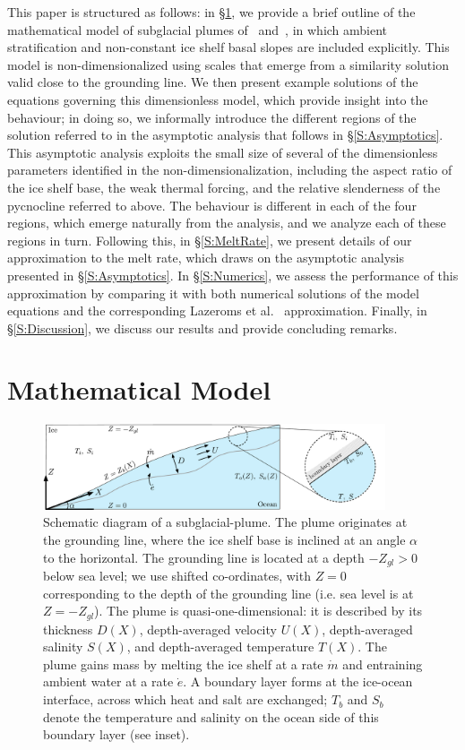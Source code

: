 \documentclass[openacc]{rsproca_new}%
\begin{document}
This paper is structured as follows: in \S\ref{S:Model}, we provide a brief outline of the mathematical model of subglacial plumes of~\cite{Jenkins1991JGeophysResOceans} and~\cite{Jenkins2011JPhysOcean}, in which ambient stratification and non-constant ice shelf basal slopes are included explicitly. This model is non-dimensionalized using scales that emerge from a similarity solution valid close to the grounding line. We then present example solutions of the equations governing this dimensionless model, which provide insight into the behaviour; in doing so, we informally introduce the different regions of the solution referred to in the asymptotic analysis that follows in \S\ref{S:Asymptotics}. This asymptotic analysis exploits the small size of several of the dimensionless parameters identified in the non-dimensionalization, including the aspect ratio of the ice shelf base, the weak thermal forcing, and the relative slenderness of the pycnocline referred to above. The behaviour is different in each of the four regions, which emerge naturally from the analysis, and we analyze each of these regions in turn. Following this, in \S\ref{S:MeltRate}, we present details of our approximation to the melt rate, which draws on the asymptotic analysis presented in \S\ref{S:Asymptotics}. In \S\ref{S:Numerics}, we assess the performance of this approximation by comparing it with both numerical solutions of the model equations and the corresponding Lazeroms et al.~\cite{Lazeroms2019JPhysOcean} approximation. Finally, in \S\ref{S:Discussion}, we discuss our results and provide concluding remarks. 


\section{Mathematical Model}\label{S:Model}

\begin{figure}
\centering
\includegraphics[width = 0.9\textwidth]{./make_plots/plots/figure1.pdf}
\caption{Schematic diagram of a subglacial-plume. The plume originates at the grounding line, where the ice shelf base is inclined at an angle $\alpha$ to the horizontal. The grounding line is located at a depth $-Z_{gl} >0$ below sea level; we use shifted co-ordinates, with $Z = 0$ corresponding to the depth of the grounding line (i.e. sea level is at $Z = -Z_{gl}$). The plume is quasi-one-dimensional: it is described by its thickness $D(X)$, depth-averaged velocity $U(X)$, depth-averaged salinity $S(X)$, and depth-averaged temperature $T(X)$.  The plume gains mass by melting the ice shelf at a rate $\dot{m}$ and entraining ambient water at a rate $\dot{e}$. A boundary layer forms at the ice-ocean interface, across which heat and salt are exchanged; $T_b$ and $S_b$ denote the temperature and salinity on the ocean side of this boundary layer (see inset).}\label{fig:Schematic}
\end{figure}
\end{document}
